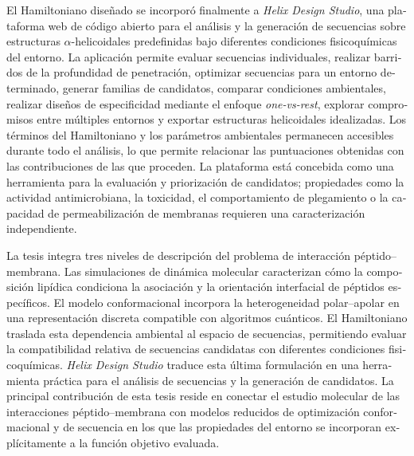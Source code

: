 \begin{otherlanguage}{spanish}
El Hamiltoniano diseñado se incorporó finalmente a \textit{Helix Design Studio}, una plataforma web de código abierto para el análisis y la generación de secuencias sobre estructuras $\alpha$-helicoidales predefinidas bajo diferentes condiciones fisicoquímicas del entorno. La aplicación permite evaluar secuencias individuales, realizar barridos de la profundidad de penetración, optimizar secuencias para un entorno determinado, generar familias de candidatos, comparar condiciones ambientales, realizar diseños de especificidad mediante el enfoque \textit{one-vs-rest}, explorar compromisos entre múltiples entornos y exportar estructuras helicoidales idealizadas. Los términos del Hamiltoniano y los parámetros ambientales permanecen accesibles durante todo el análisis, lo que permite relacionar las puntuaciones obtenidas con las contribuciones de las que proceden. La plataforma está concebida como una herramienta para la evaluación y priorización de candidatos; propiedades como la actividad antimicrobiana, la toxicidad, el comportamiento de plegamiento o la capacidad de permeabilización de membranas requieren una caracterización independiente.

La tesis integra tres niveles de descripción del problema de interacción péptido--membrana. Las simulaciones de dinámica molecular caracterizan cómo la composición lipídica condiciona la asociación y la orientación interfacial de péptidos específicos. El modelo conformacional incorpora la heterogeneidad polar--apolar en una representación discreta compatible con algoritmos cuánticos. El Hamiltoniano traslada esta dependencia ambiental al espacio de secuencias, permitiendo evaluar la compatibilidad relativa de secuencias candidatas con diferentes condiciones fisicoquímicas. \textit{Helix Design Studio} traduce esta última formulación en una herramienta práctica para el análisis de secuencias y la generación de candidatos. La principal contribución de esta tesis reside en conectar el estudio molecular de las interacciones péptido--membrana con modelos reducidos de optimización conformacional y de secuencia en los que las propiedades del entorno se incorporan explícitamente a la función objetivo evaluada.
\end{otherlanguage}